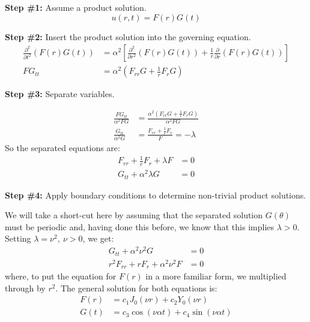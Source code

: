 \vspace{0.25cm}

\noindent\textbf{Step \#1:} Assume a product solution.
\begin{equation*}
u(r,t) = F(r)G(t)
\end{equation*}

\vspace{0.25cm}

\noindent\textbf{Step \#2:} Insert the product solution into the governing equation.
\begin{align*}
\frac{\partial^2 }{\partial t^2}\left(F(r)G(t)\right) &= \alpha^2 \left[\frac{\partial^2}{\partial r^2}\left(F(r)G(t) \right) + \frac{1}{r}\frac{\partial}{\partial r}\left(F(r)G(t)\right) \right] \\
FG_{tt} &= \alpha^2 \left(F_{rr}G + \frac{1}{r}F_rG \right)
\end{align*}

\vspace{0.25cm}

\noindent\textbf{Step \#3:} Separate variables.

\begin{align*}
\frac{FG_{tt}}{\alpha^2 FG} &= \frac{\alpha^2 \left(F_{rr}G + \frac{1}{r}F_rG \right)}{\alpha^2 FG} \\
\frac{G_{tt}}{\alpha^2 G} &= \frac{F_{rr} + \frac{1}{r}F_r}{F} = -\lambda
\end{align*}
So the separated equations are:
\begin{align*}
F_{rr} + \frac{1}{r}F_r + \lambda F &= 0 \\
G_{tt} + \alpha^2 \lambda G &= 0
\end{align*}

\vspace{0.25cm}

\noindent\textbf{Step \#4:} Apply boundary conditions to determine non-trivial product solutions.

\vspace{0.25cm}

\noindent We will take a short-cut here by assuming that the separated solution $G(\theta)$ must be periodic and, having done this before, we know that this implies $\lambda >0$.  Setting $\lambda = \nu^2, \ \nu>0$, we get:
\begin{align*}
G_{tt} + \alpha^2 \nu^2 G &= 0 \\
r^2F_{rr} + rF_r + \alpha^2\nu^2 F &= 0
\end{align*}
where, to put the equation for $F(r)$ in a more familiar form, we multiplied through by $r^2$.  The general solution for both equations is:
\begin{align*}
F(r) &= c_1J_0(\nu r) + c_2 Y_0(\nu r) \\
G(t) &= c_3\cos(\nu \alpha t) + c_4 \sin(\nu \alpha t)
\end{align*}

